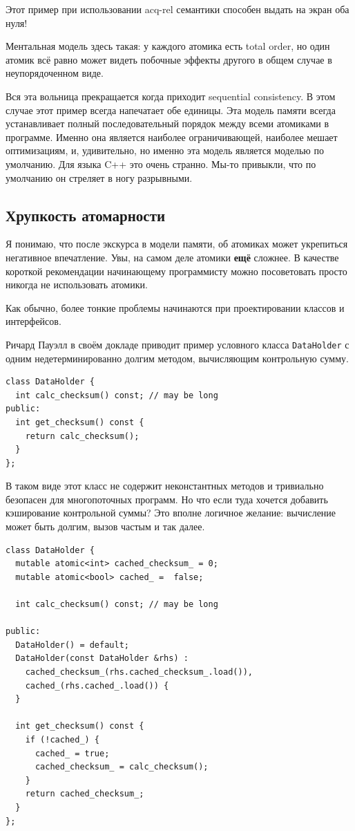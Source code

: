 \documentclass[a4paper,12pt,oneside]{book}
\newif\ifmulti
\begin{document}
Этот пример при использовании acq-rel семантики способен выдать на экран оба нуля!

Ментальная модель здесь такая: у каждого атомика есть total order, но один атомик всё равно может видеть побочные эффекты другого в общем случае в неупорядоченном виде.

Вся эта вольница прекращается когда приходит sequential consistency. В этом случае этот пример всегда напечатает обе единицы. Эта модель памяти всегда устанавливает полный последовательный порядок между всеми атомиками в программе. Именно она является наиболее ограничивающей, наиболее мешает оптимизациям, и, удивительно, но именно эта модель является моделью по умолчанию. Для языка C++ это очень странно. Мы-то привыкли, что по умолчанию он стреляет в ногу разрывными.

\ifmulti
TODO?: про observable side effects и оптимизацию циклов
\fi

\subsection{Хрупкость атомарности}\label{sub:atomicproblems}

Я понимаю, что после экскурса в модели памяти, об атомиках может укрепиться негативное впечатление. Увы, на самом деле атомики \textbf{ещё} сложнее. В качестве короткой рекомендации начинающему программисту можно посоветовать просто никогда не использовать атомики.

Как обычно, более тонкие проблемы начинаются при проектировании классов и интерфейсов.

Ричард Пауэлл в своём докладе \cite{talk:powell} приводит пример условного класса \lstinline!DataHolder! с одним недетерминированно долгим методом, вычисляющим контрольную сумму.

\begin{lstlisting}
class DataHolder {
  int calc_checksum() const; // may be long
public:
  int get_checksum() const {
    return calc_checksum();
  }
};
\end{lstlisting}

В таком виде этот класс не содержит неконстантных методов и тривиально безопасен для многопоточных программ. Но что если туда хочется добавить кэширование контрольной суммы? Это вполне логичное желание: вычисление может быть долгим, вызов частым и так далее.

\begin{lstlisting}
class DataHolder {
  mutable atomic<int> cached_checksum_ = 0;
  mutable atomic<bool> cached_ =  false;

  int calc_checksum() const; // may be long  

public:
  DataHolder() = default;
  DataHolder(const DataHolder &rhs) :
    cached_checksum_(rhs.cached_checksum_.load()),
    cached_(rhs.cached_.load()) {
  }

  int get_checksum() const {
    if (!cached_) {
      cached_ = true;
      cached_checksum_ = calc_checksum();
    }
    return cached_checksum_;
  }
};
\end{lstlisting}
\end{document}
